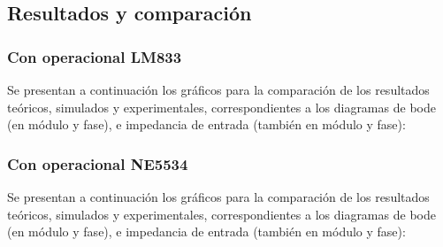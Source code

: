 \subsection{Resultados y comparación}
\subsubsection{Con operacional LM833}
Se presentan a continuación los gráficos para la comparación de los resultados teóricos, simulados y experimentales, correspondientes a los diagramas de bode (en módulo y fase), e impedancia de entrada (también en módulo y fase):



\subsubsection{Con operacional NE5534}
Se presentan a continuación los gráficos para la comparación de los resultados teóricos, simulados y experimentales, correspondientes a los diagramas de bode (en módulo y fase), e impedancia de entrada (también en módulo y fase):